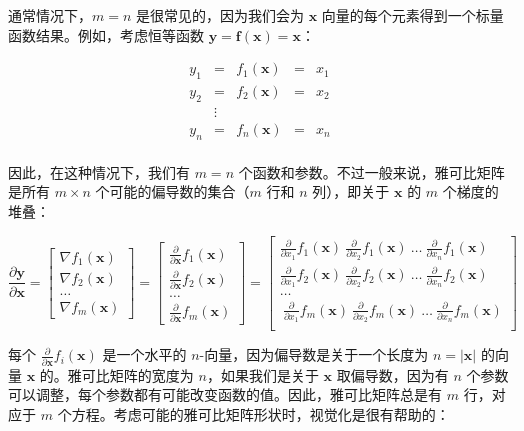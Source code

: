 \documentclass[lang=cn,newtx,10pt,scheme=chinese]{elegantbook}
\begin{document}
通常情况下，$m=n$ 是很常见的，因为我们会为 $\mathbf{x}$ 向量的每个元素得到一个标量函数结果。例如，考虑恒等函数 $\mathbf{y} = \mathbf{f(x)} = \mathbf{x}$：

\[\begin{array}{lclcc}
 y_1 & = & f_1(\mathbf{x})& = & x_1\\
 y_2 & = & f_2(\mathbf{x})& = & x_2\\
 & \vdots & \\
 y_n & = & f_n(\mathbf{x})& = & x_n\\
\end{array}\]

因此，在这种情况下，我们有 $m=n$ 个函数和参数。不过一般来说，雅可比矩阵是所有 $m \times n$ 个可能的偏导数的集合（$m$ 行和 $n$ 列），即关于 $\mathbf{x}$ 的 $m$ 个梯度的堆叠：

\[
\frac{\partial \mathbf{y}}{\partial \mathbf{x}} = \begin{bmatrix}
\nabla f_1(\mathbf{x}) \\
\nabla f_2(\mathbf{x})\\
\ldots\\
\nabla f_m(\mathbf{x})
\end{bmatrix} = \begin{bmatrix}
\frac{\partial}{\partial \mathbf{x}} f_1(\mathbf{x}) \\
\frac{\partial}{\partial \mathbf{x}} f_2(\mathbf{x})\\
\ldots\\
\frac{\partial}{\partial \mathbf{x}} f_m(\mathbf{x})
\end{bmatrix} = \begin{bmatrix}
\frac{\partial}{\partial {x_1}} f_1(\mathbf{x})~ \frac{\partial}{\partial {x_2}} f_1(\mathbf{x}) ~\ldots~ \frac{\partial}{\partial {x_n}} f_1(\mathbf{x}) \\
\frac{\partial}{\partial {x_1}} f_2(\mathbf{x})~ \frac{\partial}{\partial {x_2}} f_2(\mathbf{x}) ~\ldots~ \frac{\partial}{\partial {x_n}} f_2(\mathbf{x}) \\
\ldots\\
~\frac{\partial}{\partial {x_1}} f_m(\mathbf{x})~ \frac{\partial}{\partial {x_2}} f_m(\mathbf{x}) ~\ldots~ \frac{\partial}{\partial {x_n}} f_m(\mathbf{x}) \\
\end{bmatrix}
\]

每个 $\frac{\partial}{\partial \mathbf{x}} f_i(\mathbf{x})$ 是一个水平的 $n$-向量，因为偏导数是关于一个长度为 $n = |\mathbf{x}|$ 的向量 $\mathbf{x}$ 的。雅可比矩阵的宽度为 $n$，如果我们是关于 $\mathbf{x}$ 取偏导数，因为有 $n$ 个参数可以调整，每个参数都有可能改变函数的值。因此，雅可比矩阵总是有 $m$ 行，对应于 $m$ 个方程。考虑可能的雅可比矩阵形状时，视觉化是很有帮助的：
\end{document}

